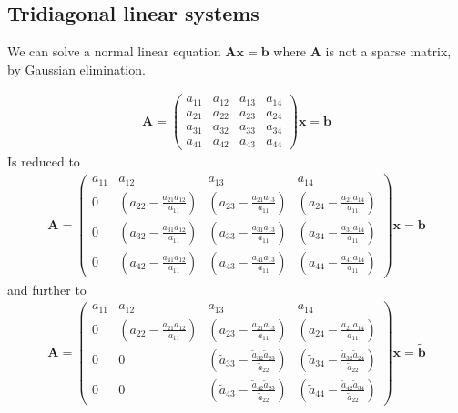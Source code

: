 \subsection{Tridiagonal linear systems}

We can solve a normal linear equation $\mathbf{A}\mathbf{x} = \mathbf{b}$ where $\mathbf{A}$ is not a sparse matrix, by Gaussian elimination.

\begin{align}
  \mathbf{A} = 
 \left( \begin{array}{rrrr}
 a_{11} & a_{12} & a_{13} & a_{14} \\
 a_{21} & a_{22} & a_{23} & a_{24} \\
 a_{31} & a_{32} & a_{33} & a_{34} \\
 a_{41} & a_{42} & a_{43} & a_{44}
 \end{array} \right)\mathbf{x} = \mathbf{b}
\end{align}
Is reduced to
\begin{align}
  \mathbf{A} = 
 \left( \begin{array}{rrrr}
 a_{11} & a_{12} & a_{13} & a_{14} \\
 0 & (a_{22}-\frac{a_{21}a_{12}}{a_{11}}) & (a_{23}-\frac{a_{21}a_{13}}{a_{11}}) & (a_{24}-\frac{a_{21}a_{14}}{a_{11}}) \\
 0 & (a_{32}-\frac{a_{31}a_{12}}{a_{11}}) & (a_{33}-\frac{a_{31}a_{13}}{a_{11}}) & (a_{34}-\frac{a_{31}a_{14}}{a_{11}}) \\
 0 & (a_{42}-\frac{a_{41}a_{12}}{a_{11}}) & (a_{43}-\frac{a_{41}a_{13}}{a_{11}}) & (a_{44}-\frac{a_{41}a_{14}}{a_{11}})
 \end{array} \right)\mathbf{x} = \tilde{\mathbf{b}}
\end{align}
and further to
\begin{align}
  \mathbf{A} = 
 \left( \begin{array}{rrrr}
 a_{11} & a_{12} & a_{13} & a_{14} \\
 0 & (a_{22}-\frac{a_{21}a_{12}}{a_{11}}) & (a_{23}-\frac{a_{21}a_{13}}{a_{11}}) & (a_{24}-\frac{a_{21}a_{14}}{a_{11}}) \\
 0 & 0 & (\tilde{a}_{33}-\frac{\tilde{a}_{32}\tilde{a}_{23}}{\tilde{a}_{22}}) & (\tilde{a}_{34}-\frac{\tilde{a}_{32}\tilde{a}_{24}}{\tilde{a}_{22}}) \\
 0 & 0 & (\tilde{a}_{43}-\frac{\tilde{a}_{42}\tilde{a}_{23}}{\tilde{a}_{22}}) & (\tilde{a}_{44}-\frac{\tilde{a}_{42}\tilde{a}_{34}}{\tilde{a}_{22}})
 \end{array} \right)\mathbf{x} = \tilde{\mathbf{b}}
\end{align}
